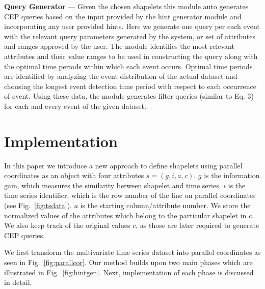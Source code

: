 \documentclass[conference]{IEEEtran}  %
\begin{document}
\textbf{Query Generator} --- Given the chosen shapelets this module auto generates CEP queries based on the input provided by the hint generator module and incorporating any user provided hints. Here we generate one query per each event with the relevant query parameters generated by the system, or set of attributes and ranges approved by the user. The module identifies the most relevant attributes and their value ranges to be used in constructing the query along with the optimal time periods within which each event occurs. Optimal time periods are identified by analyzing the event distribution of the actual dataset and choosing the longest event detection time period with respect to each occurrence of event. Using these data, the module generates filter queries (similar to Eq. 3) for each and every event of the given dataset.

\section{Implementation}
In this paper we introduce a new approach to define shapelets using parallel coordinates as an object with four attributes ${s = (g,i,a,c)}$. $g$ is the information gain, which measures the similarity between shapelet and time series. $i$ is the time series identifier, which is the row number of the line on parallel coordinates (see Fig.~\ref{fig:tsdata}). $a$ is the starting column/attribute number. We store the normalized values of the attributes which belong to the particular shapelet in $c$. We also keep track of the original values $c$, as those are later required to generate CEP queries.

We first transform the multivariate time series dataset into parallel coordinates as seen in Fig.~\ref{fig:parallcor}. Our method builds upon two main phases which are illustrated in Fig.~\ref{fig:hintgen}. Next, implementation of each phase is discussed in detail.
\end{document}
